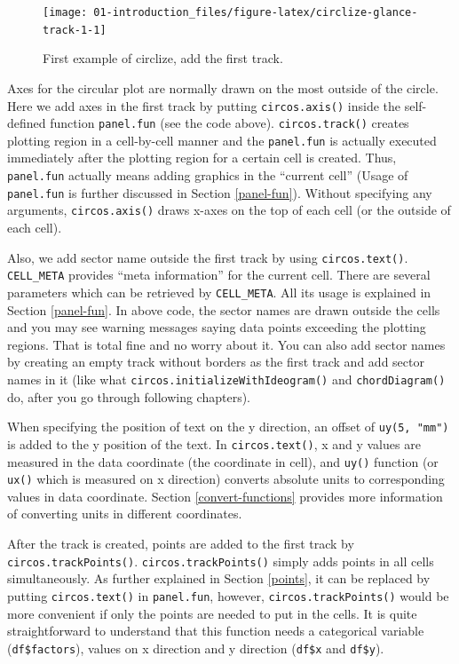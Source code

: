 \documentclass[]{book}
\begin{document}
\begin{figure}

{\centering \texttt{[image: 01-introduction\_files/figure-latex/circlize-glance-track-1-1]} 

}

\caption{First example of circlize, add the first track.}\label{fig:circlize-glance-track-1}
\end{figure}

Axes for the circular plot are normally drawn on the most outside of the
circle. Here we add axes in the first track by putting
\texttt{circos.axis()} inside the self-defined function
\texttt{panel.fun} (see the code above). \texttt{circos.track()} creates
plotting region in a cell-by-cell manner and the \texttt{panel.fun} is
actually executed immediately after the plotting region for a certain
cell is created. Thus, \texttt{panel.fun} actually means adding graphics
in the ``current cell'' (Usage of \texttt{panel.fun} is further
discussed in Section \ref{panel-fun}). Without specifying any arguments,
\texttt{circos.axis()} draws x-axes on the top of each cell (or the
outside of each cell).

Also, we add sector name outside the first track by using
\texttt{circos.text()}. \texttt{CELL\_META} provides ``meta
information'' for the current cell. There are several parameters which
can be retrieved by \texttt{CELL\_META}. All its usage is explained in
Section \ref{panel-fun}. In above code, the sector names are drawn
outside the cells and you may see warning messages saying data points
exceeding the plotting regions. That is total fine and no worry about
it. You can also add sector names by creating an empty track without
borders as the first track and add sector names in it (like what
\texttt{circos.initializeWithIdeogram()} and \texttt{chordDiagram()} do,
after you go through following chapters).

When specifying the position of text on the y direction, an offset of
\texttt{uy(5,\ "mm")} is added to the y position of the text. In
\texttt{circos.text()}, x and y values are measured in the data
coordinate (the coordinate in cell), and \texttt{uy()} function (or
\texttt{ux()} which is measured on x direction) converts absolute units
to corresponding values in data coordinate. Section
\ref{convert-functions} provides more information of converting units in
different coordinates.

After the track is created, points are added to the first track by
\texttt{circos.trackPoints()}. \texttt{circos.trackPoints()} simply adds
points in all cells simultaneously. As further explained in Section
\ref{points}, it can be replaced by putting \texttt{circos.text()} in
\texttt{panel.fun}, however, \texttt{circos.trackPoints()} would be more
convenient if only the points are needed to put in the cells. It is
quite straightforward to understand that this function needs a
categorical variable (\texttt{df\$factors}), values on x direction and y
direction (\texttt{df\$x} and \texttt{df\$y}).
\end{document}
